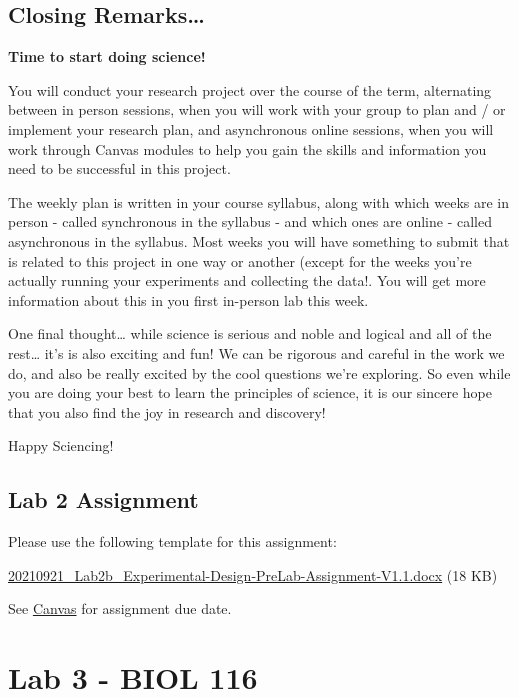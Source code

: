 \documentclass[
]{book}
\begin{document}
\hypertarget{closing-remarks}{%
\chapter*{Closing Remarks\ldots{}}\label{closing-remarks}}

\textbf{Time to start doing science!}

You will conduct your research project over the course of the term, alternating between in person sessions, when you will work with your group to plan and / or implement your research plan, and asynchronous online sessions, when you will work through Canvas modules to help you gain the skills and information you need to be successful in this project.

The weekly plan is written in your course syllabus, along with which weeks are in person - called synchronous in the syllabus - and which ones are online - called asynchronous in the syllabus. Most weeks you will have something to submit that is related to this project in one way or another (except for the weeks you're actually running your experiments and collecting the data!. You will get more information about this in you first in-person lab this week.

One final thought\ldots{} while science is serious and noble and logical and all of the rest\ldots{} it's is also exciting and fun! We can be rigorous and careful in the work we do, and also be really excited by the cool questions we're exploring. So even while you are doing your best to learn the principles of science, it is our sincere hope that you also find the joy in research and discovery!

Happy Sciencing!

\hypertarget{lab-2-assignment}{%
\chapter*{Lab 2 Assignment}\label{lab-2-assignment}}

Please use the following template for this assignment:

\href{https://osf.io/download/dpt2m}{20210921\_Lab2b\_Experimental-Design-PreLab-Assignment-V1.1.docx} (18 KB)

See \href{https://canvas.ubc.ca}{Canvas} for assignment due date.

\hypertarget{part-lab-3---biol-116}{%
\part*{Lab 3 - BIOL 116}\label{part-lab-3---biol-116}}
\end{document}
